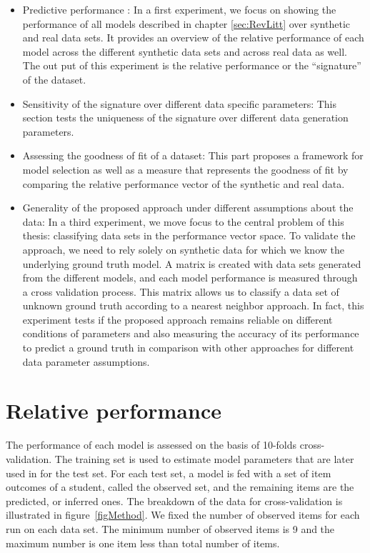 \begin{itemize}
\item Predictive performance : In a first experiment, we focus on showing the performance of all models described in chapter \ref{sec:RevLitt} over synthetic and real data sets.  It provides an overview of the relative performance of each model across the different synthetic data sets and across real data as well. The out put of this experiment is the relative performance or the ``signature'' of the dataset.
\item Sensitivity of the signature over different data specific parameters: This section tests the uniqueness of the signature over different data generation parameters.
\item Assessing the goodness of fit of a dataset: This part proposes a framework for model selection as well as a measure that represents the goodness of fit by comparing the relative performance vector of the synthetic and real data.
\item Generality of the proposed approach under different assumptions about the data: In a third experiment, we move focus to the central problem of this thesis: classifying data sets in the performance vector space.  To validate the approach, we need to rely solely on synthetic data for which we know the underlying ground truth model.  A matrix is created with data sets generated from the different models, and each model performance is measured through a cross validation process.  This matrix allows us to classify a data set of unknown ground truth according to a nearest neighbor approach. In fact, this experiment tests if the proposed approach remains reliable on different conditions of parameters and also measuring the accuracy of its performance to predict a ground truth in comparison with other approaches for different data parameter assumptions.
\end{itemize}

 


\section{Relative performance}

The performance of each model is assessed on the basis of 10-folds cross-validation.  The training set is used to estimate model parameters that are later used in for the test set. For each test set, a model is fed with a set of item outcomes of a student, called the observed set, and the remaining items are the predicted, or inferred ones. The breakdown of the data for cross-validation is illustrated in figure~\ref{figMethod}. We fixed the number of observed items for each run on each data set. The minimum number of observed items is 9 and the maximum number is one item less than total number of items. 

